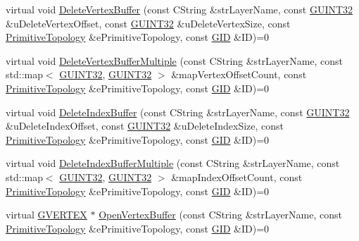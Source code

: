 \begin{DoxyCompactItemize}
\item 
virtual void \hyperlink{class_c_g_d_c_a78ceb6d6b37549aff4a955b8b453e983}{Delete\+Vertex\+Buffer} (const C\+String \&str\+Layer\+Name, const \hyperlink{_g_types_8h_a2e1a1c77d1349057202e2f34e071019c}{G\+U\+I\+N\+T32} \&u\+Delete\+Vertex\+Offset, const \hyperlink{_g_types_8h_a2e1a1c77d1349057202e2f34e071019c}{G\+U\+I\+N\+T32} \&u\+Delete\+Vertex\+Size, const \hyperlink{_g_types_8h_a940e3da6a9b57aae3de0b050e2a7af5e}{Primitive\+Topology} \&e\+Primitive\+Topology, const \hyperlink{_g_types_8h_a5b96ecb16d8e437977d12cd40aa6f6d8}{G\+I\+D} \&I\+D)=0
\item 
virtual void \hyperlink{class_c_g_d_c_a28c2ef9593d5910db3308ab645ee45cb}{Delete\+Vertex\+Buffer\+Multiple} (const C\+String \&str\+Layer\+Name, const std\+::map$<$ \hyperlink{_g_types_8h_a2e1a1c77d1349057202e2f34e071019c}{G\+U\+I\+N\+T32}, \hyperlink{_g_types_8h_a2e1a1c77d1349057202e2f34e071019c}{G\+U\+I\+N\+T32} $>$ \&map\+Vertex\+Offset\+Count, const \hyperlink{_g_types_8h_a940e3da6a9b57aae3de0b050e2a7af5e}{Primitive\+Topology} \&e\+Primitive\+Topology, const \hyperlink{_g_types_8h_a5b96ecb16d8e437977d12cd40aa6f6d8}{G\+I\+D} \&I\+D)=0
\item 
virtual void \hyperlink{class_c_g_d_c_a8258674f0494fc99abefa7a6cd100e04}{Delete\+Index\+Buffer} (const C\+String \&str\+Layer\+Name, const \hyperlink{_g_types_8h_a2e1a1c77d1349057202e2f34e071019c}{G\+U\+I\+N\+T32} \&u\+Delete\+Index\+Offset, const \hyperlink{_g_types_8h_a2e1a1c77d1349057202e2f34e071019c}{G\+U\+I\+N\+T32} \&u\+Delete\+Index\+Size, const \hyperlink{_g_types_8h_a940e3da6a9b57aae3de0b050e2a7af5e}{Primitive\+Topology} \&e\+Primitive\+Topology, const \hyperlink{_g_types_8h_a5b96ecb16d8e437977d12cd40aa6f6d8}{G\+I\+D} \&I\+D)=0
\item 
virtual void \hyperlink{class_c_g_d_c_a142b1bdff4bf2fae9a61e629a0649a0d}{Delete\+Index\+Buffer\+Multiple} (const C\+String \&str\+Layer\+Name, const std\+::map$<$ \hyperlink{_g_types_8h_a2e1a1c77d1349057202e2f34e071019c}{G\+U\+I\+N\+T32}, \hyperlink{_g_types_8h_a2e1a1c77d1349057202e2f34e071019c}{G\+U\+I\+N\+T32} $>$ \&map\+Index\+Offset\+Count, const \hyperlink{_g_types_8h_a940e3da6a9b57aae3de0b050e2a7af5e}{Primitive\+Topology} \&e\+Primitive\+Topology, const \hyperlink{_g_types_8h_a5b96ecb16d8e437977d12cd40aa6f6d8}{G\+I\+D} \&I\+D)=0
\item 
virtual \hyperlink{struct_g_v_e_r_t_e_x}{G\+V\+E\+R\+T\+E\+X} $\ast$ \hyperlink{class_c_g_d_c_afad1df59fd5c70c7898985c255068b04}{Open\+Vertex\+Buffer} (const C\+String \&str\+Layer\+Name, const \hyperlink{_g_types_8h_a940e3da6a9b57aae3de0b050e2a7af5e}{Primitive\+Topology} \&e\+Primitive\+Topology, const \hyperlink{_g_types_8h_a5b96ecb16d8e437977d12cd40aa6f6d8}{G\+I\+D} \&I\+D)=0

\end{DoxyCompactItemize}
